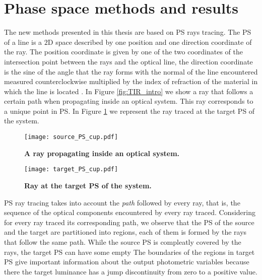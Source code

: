 \section{Phase space methods and results}
The new methods presented in this thesis are based on PS rays tracing. The PS of a line is a $2$D space described by one position and one direction coordinate of the ray. 
The position coordinate is given by one of the two coordinates of the intersection point between the rays and the optical line, the direction coordinate is the sine of the angle that the ray forms with the normal of the line encountered measured counterclockwise multiplied by the index of refraction of the material in which the line is located \cite{wolf2004geometric}. In Figure \ref{fig:TIR_intro} we show a ray that follows a certain path when propagating inside an optical system. This ray corresponds to a unique point in PS. In Figure \ref{fig:PS_intro} we represent the ray traced at the target PS of the system.
\begin{figure}[t]
  \begin{minipage}[t]{0.49\textwidth}
\centering
    \texttt{[image: source\_PS\_cup.pdf]}
    \caption{\textbf{A ray propagating inside an optical system.}}
    \label{fig:TIR_intro}
  \end{minipage}
\hfill
  \begin{minipage}[t]{0.49\textwidth}
\centering
    \texttt{[image: target\_PS\_cup.pdf]}
  \caption{\textbf{Ray at the target PS of the system.}}
\label{fig:PS_intro}
 \end{minipage}
\end{figure}
PS ray tracing takes into account the \textit{path} followed by every ray, that is, the sequence of the optical components encountered by every ray traced.
Considering for every ray traced its corresponding path, we observe that the PS of the source and the target are partitioned into regions, each of them is formed by the rays that follow the same path. 
While the source PS is compleatly covered by the rays, the target PS can have some empty  The boundaries of the regions in target PS give important information about the output photometric variables because there the target luminance has a jump discontinuity from zero to a positive value. 
